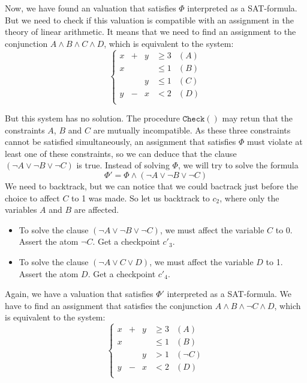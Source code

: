 \documentclass{article}
\newcommand{\icheck}{\mathtt{Check}()}
\begin{document}
Now, we have found an valuation that satisfies $\Phi$ interpreted as a
SAT-formula. But we need to check if this valuation is compatible with an
assignment in the theory of linear arithmetic. It means that we need to find an
assignment to the conjunction $A \wedge B \wedge C \wedge D$, which is equivalent
to the system:
\begin{displaymath}
  \left\{
  \begin{array}{ccccr}
    x  & + & y & \geqslant 3 & (A) \\
    x  &   &   & \leqslant 1 & (B) \\
       &   & y & \leqslant 1 & (C) \\
    y  & - & x & < 2         & (D) \\
  \end{array}
  \right.
\end{displaymath}

But this system has no solution. The procedure $\icheck$ may retun that the
constraints $A$, $B$ and $C$ are mutually incompatible. As these three
constraints cannot be satisfied simultaneously, an assignment that satisfies
$\Phi$ must violate at least one of these constraints, so we can deduce that
the clause $(\neg A \vee \neg B \vee \neg C)$ is true. Instead of solving
$\Phi$, we will try to solve the formula
$$\Phi' = \Phi \wedge (\neg A \vee \neg B \vee \neg C)$$
We need to backtrack, but we can notice that we could bactrack just before
the choice to affect $C$ to 1 was made. So let us backtrack to $c_2$, where
only the variables $A$ and $B$ are affected.

\begin{itemize}
  \item To solve the clause $(\neg A \vee \neg B \vee \neg C)$, we must affect
    the variable $C$ to 0. Assert the atom $\neg C$. Get a checkpoint $c'_3$.
  \item To solve the clause $(\neg A \vee C \vee D)$, we must affect the
    variable $D$ to 1. Assert the atom $D$. Get a checkpoint $c'_4$.
\end{itemize}

Again, we have a valuation that satisfies $\Phi'$ interpreted as a
SAT-formula. We have to find an assignment that satisfies the conjunction
$A \wedge B \wedge \neg C \wedge D$, which is equivalent to the system:
\begin{displaymath}
  \left\{
  \begin{array}{ccccr}
    x  & + & y & \geqslant 3 & (A) \\
    x  &   &   & \leqslant 1 & (B) \\
       &   & y & > 1         & (\neg C) \\
    y  & - & x & < 2         & (D) \\
  \end{array}
  \right.
\end{displaymath}
\end{document}
